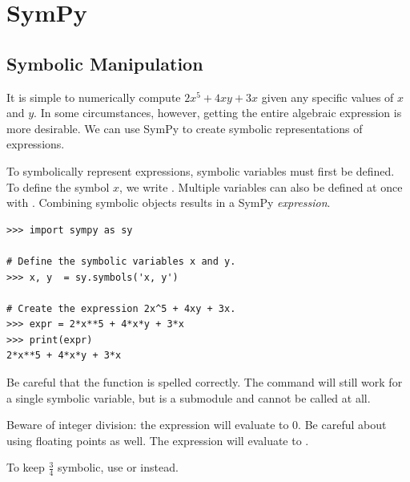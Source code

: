 \label{lab:SymPyAutograd}


\section*{SymPy} %

\subsection*{Symbolic Manipulation} %

It is simple to numerically compute $2x^5 +4xy + 3x$ given any specific values of $x$ and $y$.
In some circumstances, however, getting the entire algebraic expression is more desirable.
We can use SymPy to create symbolic representations of expressions.

To symbolically represent expressions, symbolic variables must first be defined.
To define the symbol $x$, we write .
Multiple variables can also be defined at once with .
Combining symbolic objects results in a SymPy \emph{expression}.
\begin{lstlisting}
>>> import sympy as sy

# Define the symbolic variables x and y.
>>> x, y  = sy.symbols('x, y')

# Create the expression 2x^5 + 4xy + 3x.
>>> expr = 2*x**5 + 4*x*y + 3*x
>>> print(expr)
2*x**5 + 4*x*y + 3*x
\end{lstlisting}

Be careful that the function  is spelled correctly.
The command  will still work for a single symbolic variable, but  is a submodule and cannot be called at all.

\begin{warn} %
Beware of integer division: the expression  will evaluate to 0.
Be careful about using floating points as well.
The expression  will evaluate to .

To keep $\frac{3}{4}$ symbolic, use  or  instead.
\end{warn}

